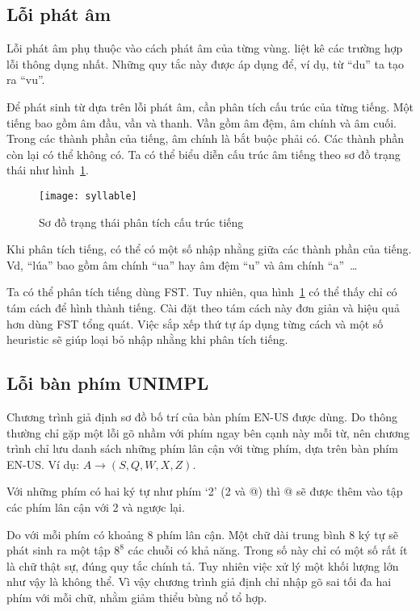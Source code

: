 \documentclass[a4paper,oneside]{book} %
\theoremstyle{break}
\begin{document}
\subsection{Lỗi phát âm}

Lỗi phát âm phụ thuộc vào cách phát âm của từng
vùng. \cite{LoiChinhTa} liệt kê các trường hợp lỗi thông dụng
nhất. Những quy tắc này được áp dụng để, ví dụ, từ   ``du'' ta tạo ra
``vu''. 

Để phát sinh từ dựa trên lỗi phát âm, cần phân tích cấu trúc của từng
tiếng. Một tiếng bao gồm âm đầu, vần và thanh. Vần gồm âm đệm, âm
chính và âm cuối. Trong các thành phần của tiếng, âm chính là bắt buộc
phải có. Các thành phần còn lại có thể không có. Ta có thể biểu diễn
cấu trúc âm tiếng theo sơ đồ trạng thái như hình~\ref{fig:syllable}.

\begin{figure}[htbp]
  \centering
  \texttt{[image: syllable]}
  \caption{Sơ đồ trạng thái phân tích cấu trúc tiếng}
  \label{fig:syllable}
\end{figure}

Khi phân tích tiếng, có thể có một số nhập nhằng giữa các thành phần
của tiếng. Vd, ``lúa'' bao gồm âm chính ``ua'' hay âm đệm ``u'' và âm
chính ``a''~\ldots

Ta có thể phân tích tiếng dùng FST. Tuy nhiên, qua
 hình~\ref{fig:syllable}
 có thể thấy chỉ có tám cách để hình thành
tiếng. Cài đặt theo tám cách này đơn giản và hiệu quả hơn dùng FST
tổng quát. Việc sắp xếp thứ tự áp dụng từng cách và một số heuristic
sẽ giúp loại bỏ nhập nhằng khi phân tích tiếng. 

\subsection{Lỗi bàn phím UNIMPL}

Chương trình giả định sơ đồ bố trí của bàn phím EN-US được dùng. Do
thông thường chỉ gặp một lỗi gõ nhầm với phím ngay bên cạnh này mỗi
từ, nên chương trình chỉ lưu danh  sách những phím lân cận với từng
phím, dựa trên bàn phím EN-US. Ví dụ: $A \rightarrow (S,Q,W,X,Z)$. 

Với những phím có hai ký tự như phím `2' (2 và @) thì @ sẽ được thêm
vào tập các phím lân cận với 2 và ngược lại.

Do với mỗi phím có khoảng 8 phím lân cận. Một chữ dài trung bình 8 ký
tự sẽ phát sinh ra một tập $8^8$ các chuỗi có khả năng. Trong số này
chỉ có một số rất ít là chữ thật sự, đúng quy tắc chính tả. Tuy nhiên
việc xử lý một khối lượng lớn như vậy là không thể. Vì vậy chương
trình giả định chỉ nhập gõ sai tối đa hai phím với mỗi chữ, nhằm giảm
thiểu bùng nổ tổ hợp.
\end{document}
